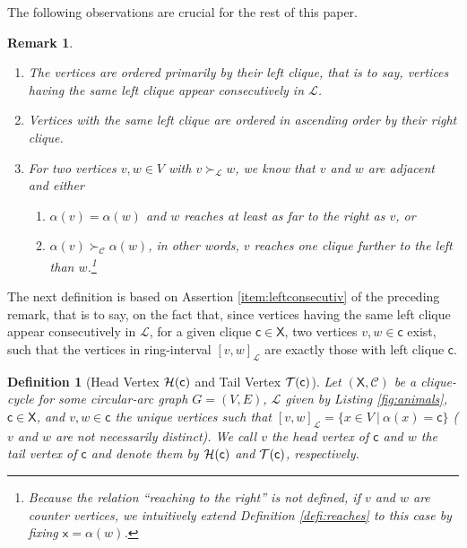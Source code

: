 \documentclass[10pt]{article}
\newtheorem{definition}[theorem]{Definition}
\newtheorem{remark}[theorem]{Remark}
\newcommand{\q}[1]{``#1''}\newcommand{\fu}[1]{\mathcal{#1}}\newcommand{\mc}[1]{\mathsf{#1}}\newcommand{\ri}[1]{\mathscr{#1}}\newcommand{\co}[1]{\fu{C}({#1})}\newcommand{\lc}[1]{\alpha(#1)}\newcommand{\rc}[1]{\beta(#1)}\newcommand{\ema}[1]{\mathcal{#1}}\newcommand{\fe}[2]{\fu{F}(#1,#2)}\newcommand{\lv}[1]{l_{#1}}\newcommand{\rv}[1]{r_{#1}}\newcommand{\mv}[1]{m_{#1}}\newcommand{\lvv}{\lv{v}}
\begin{document}
The following observations are crucial for the rest of this paper.




\begin{remark}
\begin{enumerate}
\item\label{item:leftconsecutiv}
The vertices  are ordered primarily by their left clique, that is to say, vertices having 
the same left clique appear consecutively in $ \ri{L}$.

\item 
Vertices with the same left clique are ordered in ascending 
order by their right clique.

\item\label{item:onemoreleft}
For two vertices $v,w\in V$ with $v\succ_\ri{L} w$, we know that $v$ and $w$ are adjacent and either
\begin{enumerate}

\item
$\lc{v}=\lc{w}$ and $w$ reaches at least as far to the right as $v$, or

\item
$\lc{v}\succ_\ri{C}\lc{w}$, in other words, $v$ reaches one clique further to the 
left than $w$.\footnote{Because the relation \q{reaching to the right} is not defined, if $v$ and $w$ are counter vertices, we intuitively extend Definition \ref{defi:reaches} to this case by fixing $\mc{x} = \lc{w}$.}

\end{enumerate}
\end{enumerate}
\end{remark}

The next definition is based on Assertion \ref{item:leftconsecutiv} of the preceding 
remark, that is to say, on the fact that, since vertices having the same left clique 
appear consecutively in $\ri{L}$, for a given clique $\mc{c}\in\mc{X}$, two 
vertices $v,w\in \mc{c}$ exist, such that the vertices in  ring-interval $[v,w]_\ri{L}$ are 
exactly those with left clique $\mc{c}$.

\begin{definition}[Head Vertex $\first{\mc{c}}$ and Tail Vertex $\last{\mc{c}}$]
Let $(\mc{X},\ri{C})$ be a clique-cycle for some circular-arc graph $G=(V,E)$, $\ri{L}$ 
given by Listing \ref{fig:animals}, $\mc{c}\in\mc{X}$, and $v,w\in \mc{c}$ the unique 
vertices such that $[v,w]_\ri{L}=\{x\in V~|~\lc{x} = \mc{c}\}$ ($v$ and $w$ are not necessarily distinct).
We call $v$ the \emph{head vertex of $\mc{c}$} and $w$ the \emph{tail vertex of $\mc{c}$} 
and denote them by $\first{\mc{c}}$ and $\last{\mc{c}}$, respectively.
\end{definition}
\end{document}
